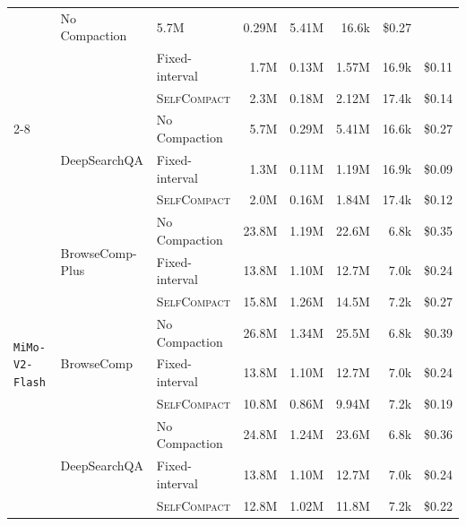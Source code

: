 \documentclass{article}
\newcommand{\method}{\textsc{{SelfCompact}}}
\begin{document}
\begin{table}[h!]
\begin{tabular}{lllrrrrr}
     & No Compaction  &  5.7M & 0.29M &  5.41M & 16.6k & \$0.27 \\
   & & Fixed-interval &  1.7M & 0.13M &  1.57M & 16.9k & \$0.11 \\
   & & \method{}      &  2.3M & 0.18M &  2.12M & 17.4k & \$0.14 \\
  \cmidrule(lr){2-8}
   & \multirow{3}{*}{DeepSearchQA}
     & No Compaction  &  5.7M & 0.29M &  5.41M & 16.6k & \$0.27 \\
   & & Fixed-interval &  1.3M & 0.11M &  1.19M & 16.9k & \$0.09 \\
   & & \method{}      &  2.0M & 0.16M &  1.84M & 17.4k & \$0.12 \\
  \midrule
  \multirow{9}{*}{\texttt{MiMo-V2-Flash}}
   & \multirow{3}{*}{BrowseComp-Plus}
     & No Compaction  & 23.8M & 1.19M & 22.6M & 6.8k & \$0.35 \\
   & & Fixed-interval & 13.8M & 1.10M & 12.7M & 7.0k & \$0.24 \\
   & & \method{}      & 15.8M & 1.26M & 14.5M & 7.2k & \$0.27 \\
  \cmidrule(lr){2-8}
   & \multirow{3}{*}{BrowseComp}
     & No Compaction  & 26.8M & 1.34M & 25.5M & 6.8k & \$0.39 \\
   & & Fixed-interval & 13.8M & 1.10M & 12.7M & 7.0k & \$0.24 \\
   & & \method{}      & 10.8M & 0.86M &  9.94M & 7.2k & \$0.19 \\
  \cmidrule(lr){2-8}
   & \multirow{3}{*}{DeepSearchQA}
     & No Compaction  & 24.8M & 1.24M & 23.6M & 6.8k & \$0.36 \\
   & & Fixed-interval & 13.8M & 1.10M & 12.7M & 7.0k & \$0.24 \\
   & & \method{}      & 12.8M & 1.02M & 11.8M & 7.2k & \$0.22 \\
  \bottomrule
  \end{tabular}
  \end{table}
\end{document}
